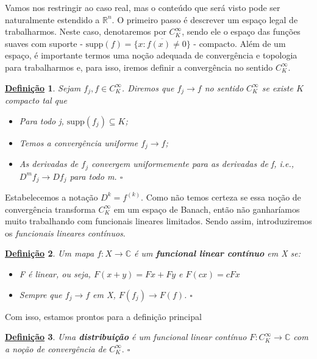 \documentclass{article}
\newtheorem*{def*}{\underline{Defini\c c\~ao}}
\begin{document}
  Vamos nos restringir ao caso real, mas o conteúdo que será visto pode ser naturalmente estendido a \(\mathbb{R}^{n}.\) O primeiro passo é descrever um espaço legal de trabalharmos. Neste caso, 
denotaremos por \(C_{K}^{\infty}\), sendo ele o espaço das funções suaves com suporte - \(\mathrm{supp}(f) = \overline{\{x: f(x)\neq0\}}\) - compacto. Além de um espaço, é importante termos uma noção adequada de convergência e topologia 
para trabalharmos e, para isso, iremos definir a convergência no sentido \(C_{K}^{\infty}.\)
 \begin{def*}
   Sejam \(f_{j}, f\in C_{K}^{\infty}\). Diremos que \(f_{j}\to f\) no sentido \(C_{K}^{\infty}\) se existe \(K\) compacto tal que 
  \begin{itemize}
    \item Para todo j, \(\mathrm{supp}(f_{j})\subseteq K\);
    \item Temos a convergência uniforme \(f_{j}\to f\);
    \item As derivadas de \(f_{j}\) convergem uniformemente para as derivadas de f, i.e., \(D^{m}f_{j}\to Df_{j}\) para todo m. \(\square\)
  \end{itemize}
 \end{def*}
  Estabelecemos a notação \(D^{k} = f^{(k)}\). 
  Como não temos certeza se essa noção de convergência transforma \(C_{K}^{\infty}\) em um espaço de Banach, então não ganharíamos muito trabalhando com funcionais lineares limitados. Sendo assim, introduziremos 
 os \textit{funcionais lineares contínuos}. 
 \begin{def*}
   Um mapa \(f:X\rightarrow \mathbb{C}\) é um \textbf{funcional linear contínuo} em X se: 
  \begin{itemize}
    \item[i)] F é linear, ou seja, \(F(x+y) = Fx + Fy\) e \(F(cx) = cFx\)
    \item[ii)] Sempre que \(f_{j}\to f\) em X, \(F(f_{j})\to F(f)\). \(\square\)
  \end{itemize}
 \end{def*}
 Com isso, estamos prontos para a definição principal 
\begin{def*}
  Uma \textbf{distribuição} é um funcional linear contínuo \(F:C_{K}^{\infty}\rightarrow \mathbb{C}\) com a noção de convergência de \(C_{K}^{\infty}.\) \(\square\)
\end{def*}
\end{document}
